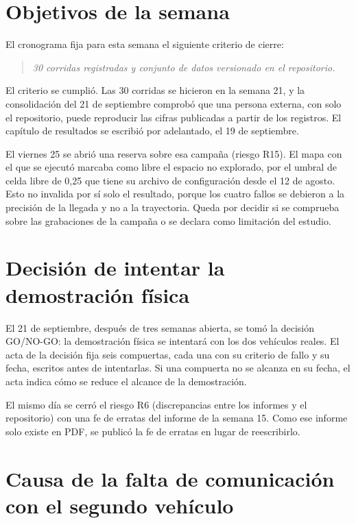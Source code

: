 \documentclass[12pt,letterpaper]{article}
\begin{document}
\section{Objetivos de la semana}
\label{sec:objetivos}

El cronograma fija para esta semana el siguiente criterio de cierre:

\begin{quote}
\textit{30 corridas registradas y conjunto de datos versionado en el repositorio.}
\end{quote}

El criterio se cumplió. Las 30 corridas se hicieron en la semana 21, y la consolidación del 21 de septiembre comprobó que una persona externa, con solo el repositorio, puede reproducir las cifras publicadas a partir de los registros. El capítulo de resultados se escribió por adelantado, el 19 de septiembre.

El viernes 25 se abrió una reserva sobre esa campaña (riesgo R15). El mapa con el que se ejecutó marcaba como libre el espacio no explorado, por el umbral de celda libre de 0,25 que tiene su archivo de configuración desde el 12 de agosto. Esto no invalida por sí solo el resultado, porque los cuatro fallos se debieron a la precisión de la llegada y no a la trayectoria. Queda por decidir si se comprueba sobre las grabaciones de la campaña o se declara como limitación del estudio.

\section{Decisión de intentar la demostración física}
\label{sec:decision}

El 21 de septiembre, después de tres semanas abierta, se tomó la decisión GO/NO-GO: la demostración física se intentará con los dos vehículos reales. El acta de la decisión fija seis compuertas, cada una con su criterio de fallo y su fecha, escritos antes de intentarlas. Si una compuerta no se alcanza en su fecha, el acta indica cómo se reduce el alcance de la demostración.

El mismo día se cerró el riesgo R6 (discrepancias entre los informes y el repositorio) con una fe de erratas del informe de la semana 15. Como ese informe solo existe en PDF, se publicó la fe de erratas en lugar de reescribirlo.

\section{Causa de la falta de comunicación con el segundo vehículo}
\label{sec:causa}
\end{document}

